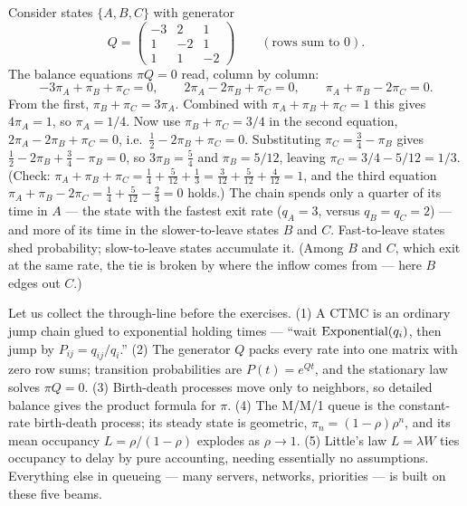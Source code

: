 \begin{example}
\label{ch27:ex-threestate}
Consider states $\{A, B, C\}$ with generator
\[
  Q = \begin{pmatrix} -3 & 2 & 1 \\ 1 & -2 & 1 \\ 1 & 1 & -2 \end{pmatrix}
  \qquad(\text{rows sum to } 0).
\]
The balance equations $\pi Q = 0$ read, column by column:
\[
  -3\pi_A + \pi_B + \pi_C = 0, \qquad
  2\pi_A - 2\pi_B + \pi_C = 0, \qquad
  \pi_A + \pi_B - 2\pi_C = 0.
\]
From the first, $\pi_B + \pi_C = 3\pi_A$. Combined with $\pi_A + \pi_B + \pi_C = 1$ this gives
$4\pi_A = 1$, so $\pi_A = 1/4$. Now use $\pi_B + \pi_C = 3/4$ in the second equation,
$2\pi_A - 2\pi_B + \pi_C = 0$, i.e.\ $\tfrac12 - 2\pi_B + \pi_C = 0$. Substituting
$\pi_C = \tfrac34 - \pi_B$ gives $\tfrac12 - 2\pi_B + \tfrac34 - \pi_B = 0$, so $3\pi_B = \tfrac54$ and
$\pi_B = 5/12$, leaving $\pi_C = 3/4 - 5/12 = 1/3$. (Check: $\pi_A + \pi_B + \pi_C = \tfrac14 +
\tfrac{5}{12} + \tfrac13 = \tfrac{3}{12}+\tfrac{5}{12}+\tfrac{4}{12} = 1$, and the third equation
$\pi_A + \pi_B - 2\pi_C = \tfrac14 + \tfrac{5}{12} - \tfrac23 = 0$ holds.) The chain spends only a
quarter of its time in $A$ --- the state with the fastest exit rate ($q_A = 3$, versus $q_B = q_C =
2$) --- and more of its time in the slower-to-leave states $B$ and $C$. Fast-to-leave states shed
probability; slow-to-leave states accumulate it. (Among $B$ and $C$, which exit at the same rate, the
tie is broken by where the inflow comes from --- here $B$ edges out $C$.)
\end{example}

\begin{recoverybox}
Let us collect the through-line before the exercises. (1) A CTMC is an ordinary jump chain glued to
exponential holding times --- ``wait $\operatorname{Exponential}(q_i)$, then jump by $P_{ij} = q_{ij}/q_i$.'' (2) The
generator $Q$ packs every rate into one matrix with zero row sums; transition probabilities are
$P(t) = e^{Qt}$, and the stationary law solves $\pi Q = 0$. (3) Birth-death processes move only to
neighbors, so detailed balance gives the product formula for $\pi$. (4) The M/M/1 queue is the
constant-rate birth-death process; its steady state is geometric, $\pi_n = (1-\rho)\rho^n$, and its
mean occupancy $L = \rho/(1-\rho)$ explodes as $\rho \to 1$. (5) Little's law $L = \lambda W$ ties
occupancy to delay by pure accounting, needing essentially no assumptions. Everything else in
queueing --- many servers, networks, priorities --- is built on these five beams.
\end{recoverybox}


